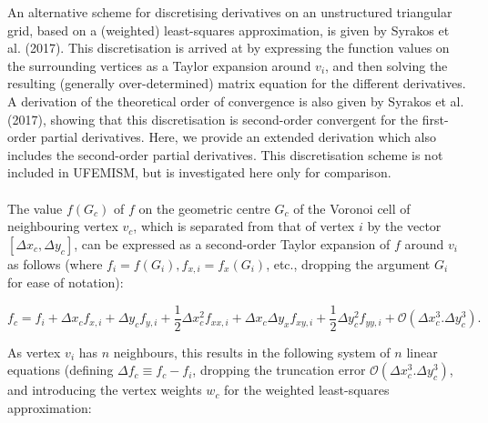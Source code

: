 \documentclass{article}
\begin{document}
An alternative scheme for discretising derivatives on an unstructured triangular grid, based on a (weighted) least-squares approximation, is given by Syrakos et al. (2017). This discretisation is arrived at by expressing the function values on the surrounding vertices as a Taylor expansion around $v_i$, and then solving the resulting (generally over-determined) matrix equation for the different derivatives. A derivation of the theoretical order of convergence is also given by Syrakos et al. (2017), showing that this discretisation is second-order convergent for the first-order partial derivatives. Here, we provide an extended derivation which also includes the second-order partial derivatives. This discretisation scheme is not included in UFEMISM, but is investigated here only for comparison.\\
\\
The value $f(G_c)$ of $f$ on the geometric centre $G_c$ of the Voronoi cell of neighbouring vertex $v_c$, which is separated from that of vertex $i$ by the vector $\left[ \Delta x_c, \Delta y_c \right]$, can be expressed as a second-order Taylor expansion of $f$ around $v_i$ as follows (where $f_i = f(G_i), f_{x,i} = f_x(G_i)$, etc., dropping the argument $G_i$ for ease of notation):

\begin{equation} \label{eq:disc_taylor}
f_c = f_i + \Delta x_c f_{x,i} + \Delta y_c f_{y,i} + \frac{1}{2} \Delta x_c^2 f_{xx,i} + \Delta x_c \Delta y_x f_{xy,i} + \frac{1}{2} \Delta y_c^2 f_{yy,i} 
+ \mathcal{O} \left( \Delta x_c^3. \Delta y_c^3 \right).
\end{equation}

As vertex $v_i$ has $n$ neighbours, this results in the following system of $n$ linear equations (defining $\Delta f_c \equiv f_c - f_i$, dropping the truncation error $\mathcal{O} \left( \Delta x_c^3. \Delta y_c^3 \right)$, and introducing the vertex weights $w_c$ for the weighted least-squares approximation:
\end{document}
